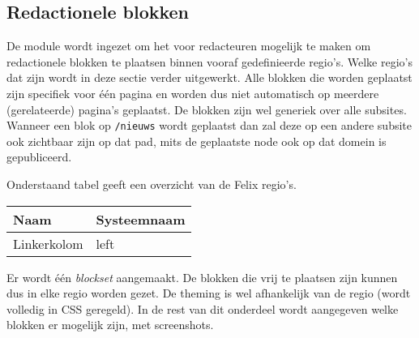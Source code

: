 \subsection{Redactionele blokken}\label{felix}

De module  wordt ingezet om het voor redacteuren mogelijk te maken om redactionele blokken te plaatsen binnen vooraf gedefinieerde regio's. Welke regio's dat zijn wordt in deze sectie verder uitgewerkt. Alle blokken die worden geplaatst zijn specifiek voor \'{e}\'{e}n pagina en worden dus niet automatisch op meerdere (gerelateerde) pagina's geplaatst. De blokken zijn wel generiek over alle subsites. Wanneer een blok op \texttt{/nieuws} wordt geplaatst dan zal deze op een andere subsite ook zichtbaar zijn op dat pad, mits de geplaatste node ook op dat domein is gepubliceerd.

Onderstaand tabel geeft een overzicht van de Felix regio's.

\begin{tabularx}{\linewidth}{| p{5cm} | X |}
\hline
\rowcolor{tableheader}
\textbf{Naam} & \textbf{Systeemnaam} \\ \hline
Linkerkolom & left \\ \hline
\end{tabularx}

Er wordt \'{e}\'{e}n \emph{blockset} aangemaakt. De blokken die vrij te plaatsen zijn kunnen dus in elke regio worden gezet. De theming is wel afhankelijk van de regio (wordt volledig in CSS geregeld). In de rest van dit onderdeel wordt aangegeven welke blokken er mogelijk zijn, met screenshots.

